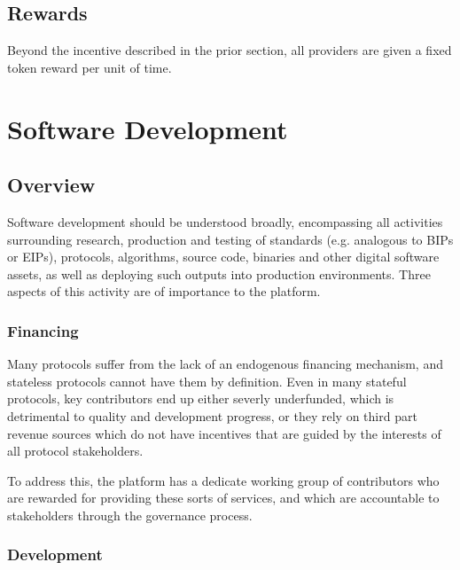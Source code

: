 \documentclass{article}
\begin{document}
\subsection{Rewards}

Beyond the incentive described in the prior section, all providers are given a fixed token reward per unit of time.

\section{Software Development}

\subsection{Overview}

Software development should be understood broadly, encompassing all activities surrounding research, production and testing of standards (e.g. analogous to BIPs or EIPs), protocols, algorithms, source code, binaries and other digital software assets, as well as deploying such outputs into production environments. Three aspects of this activity are of importance to the platform.

\subsubsection{Financing}

Many protocols suffer from the lack of an endogenous financing mechanism, and stateless protocols cannot have them by definition. Even in many stateful protocols, key contributors end up either severly underfunded, which is detrimental to quality and development progress, or they rely on third part revenue sources which do not have incentives that are guided by the interests of all protocol stakeholders.

To address this, the platform has a dedicate working group of contributors who are rewarded for providing these sorts of services, and which are accountable to stakeholders through the governance process.

\subsubsection{Development}
\end{document}
